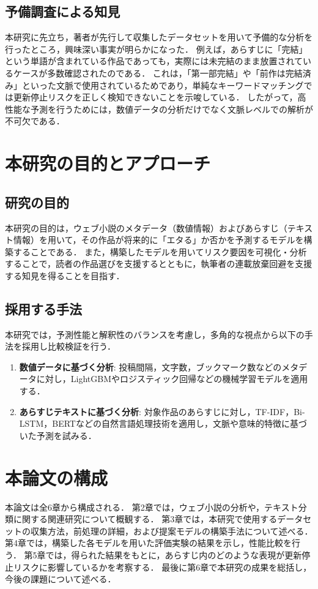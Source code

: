 \documentclass[uplatex, dvipdfmx, 11pt, a4paper, report]{jsbook}
\begin{document}
\subsection{予備調査による知見}
本研究に先立ち，著者が先行して収集したデータセットを用いて予備的な分析を行ったところ，興味深い事実が明らかになった．
例えば，あらすじに「完結」という単語が含まれている作品であっても，実際には未完結のまま放置されているケースが多数確認されたのである．
これは，「第一部完結」や「前作は完結済み」といった文脈で使用されているためであり，単純なキーワードマッチングでは更新停止リスクを正しく検知できないことを示唆している．
したがって，高性能な予測を行うためには，数値データの分析だけでなく文脈レベルでの解析が不可欠である．

\section{本研究の目的とアプローチ}

\subsection{研究の目的}
本研究の目的は，ウェブ小説のメタデータ（数値情報）およびあらすじ（テキスト情報）を用いて，その作品が将来的に「エタる」か否かを予測するモデルを構築することである．
また，構築したモデルを用いてリスク要因を可視化・分析することで，読者の作品選びを支援するとともに，執筆者の連載放棄回避を支援する知見を得ることを目指す．

\subsection{採用する手法}
本研究では，予測性能と解釈性のバランスを考慮し，多角的な視点から以下の手法を採用し比較検証を行う．

\begin{enumerate}
  \item \textbf{数値データに基づく分析}:
  投稿間隔，文字数，ブックマーク数などのメタデータに対し，LightGBMやロジスティック回帰などの機械学習モデルを適用する．
  \item \textbf{あらすじテキストに基づく分析}:
  対象作品のあらすじに対し，TF-IDF，Bi-LSTM，BERTなどの自然言語処理技術を適用し，文脈や意味的特徴に基づいた予測を試みる．
\end{enumerate}

\section{本論文の構成}
本論文は全6章から構成される．
第2章では，ウェブ小説の分析や，テキスト分類に関する関連研究について概観する．
第3章では，本研究で使用するデータセットの収集方法，前処理の詳細，および提案モデルの構築手法について述べる．
第4章では，構築した各モデルを用いた評価実験の結果を示し，性能比較を行う．
第5章では，得られた結果をもとに，あらすじ内のどのような表現が更新停止リスクに影響しているかを考察する．
最後に第6章で本研究の成果を総括し，今後の課題について述べる．
\end{document}
